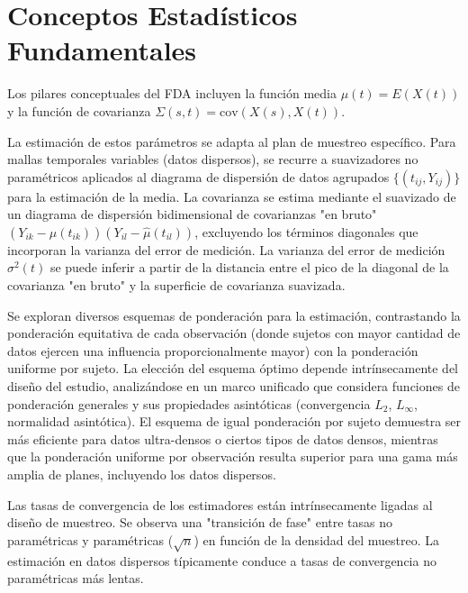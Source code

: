 \documentclass{article}
\begin{document}
\section*{\large Conceptos Estadísticos Fundamentales}
Los pilares conceptuales del FDA incluyen la función media $\mu(t) = E(X(t))$ y la función de covarianza $\Sigma(s, t) = \text{cov}(X(s), X(t))$.

La estimación de estos parámetros se adapta al plan de muestreo específico. Para mallas temporales variables (datos dispersos), se recurre a suavizadores no paramétricos aplicados al diagrama de dispersión de datos agrupados $\{(t_{ij}, Y_{ij})\}$ para la estimación de la media. La covarianza se estima mediante el suavizado de un diagrama de dispersión bidimensional de covarianzas "en bruto" $(Y_{ik} - \hat{\mu}(t_{ik}))(Y_{il} - \hat{\mu}(t_{il}))$, excluyendo los términos diagonales que incorporan la varianza del error de medición. La varianza del error de medición $\sigma^2(t)$ se puede inferir a partir de la distancia entre el pico de la diagonal de la covarianza "en bruto" y la superficie de covarianza suavizada.

\vspace{0.35cm}\noindent
Se exploran diversos esquemas de ponderación para la estimación, contrastando la ponderación equitativa de cada observación (donde sujetos con mayor cantidad de datos ejercen una influencia proporcionalmente mayor) con la ponderación uniforme por sujeto. La elección del esquema óptimo depende intrínsecamente del diseño del estudio, analizándose en un marco unificado que considera funciones de ponderación generales y sus propiedades asintóticas (convergencia $L_2$, $L_\infty$, normalidad asintótica). El esquema de igual ponderación por sujeto demuestra ser más eficiente para datos ultra-densos o ciertos tipos de datos densos, mientras que la ponderación uniforme por observación resulta superior para una gama más amplia de planes, incluyendo los datos dispersos.

\vspace{0.35cm}\noindent
Las tasas de convergencia de los estimadores están intrínsecamente ligadas al diseño de muestreo. Se observa una "transición de fase" entre tasas no paramétricas y paramétricas ($\sqrt{n}$) en función de la densidad del muestreo. La estimación en datos dispersos típicamente conduce a tasas de convergencia no paramétricas más lentas.
\end{document}
